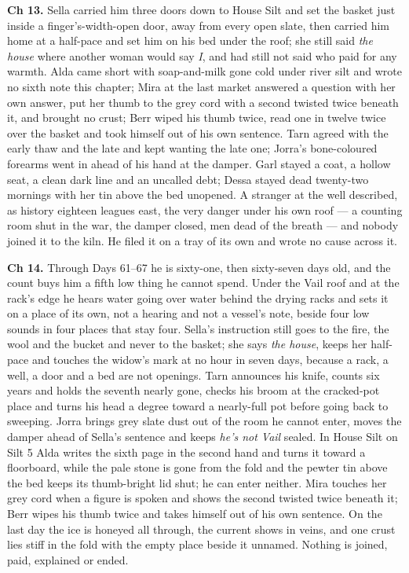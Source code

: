 \documentclass{design/chronicle}
\begin{document}
{\textbf{Ch 13.} Sella carried him three doors down to House Silt and set the basket just inside a finger’s-width-open door, away from every open slate, then carried him home at a half-pace and set him on his bed under the roof; she still said \emph{the house} where another woman would say \emph{I}, and had still not said who paid for any warmth. Alda came short with soap-and-milk gone cold under river silt and wrote no sixth note this chapter; Mira at the last market answered a question with her own answer, put her thumb to the grey cord with a second twisted twice beneath it, and brought no crust; Berr wiped his thumb twice, read one in twelve twice over the basket and took himself out of his own sentence. Tarn agreed with the early thaw and the late and kept wanting the late one; Jorra’s bone-coloured forearms went in ahead of his hand at the damper. Garl stayed a coat, a hollow seat, a clean dark line and an uncalled debt; Dessa stayed dead twenty-two mornings with her tin above the bed unopened. A stranger at the well described, as history eighteen leagues east, the very danger under his own roof --- a counting room shut in the war, the damper closed, men dead of the breath --- and nobody joined it to the kiln. He filed it on a tray of its own and wrote no cause across it.

\textbf{Ch 14.} Through Days 61–67 he is sixty-one, then sixty-seven days old, and the count buys him a fifth low thing he cannot spend. Under the Vail roof and at the rack’s edge he hears water going over water behind the drying racks and sets it on a place of its own, not a hearing and not a vessel’s note, beside four low sounds in four places that stay four. Sella’s instruction still goes to the fire, the wool and the bucket and never to the basket; she says \emph{the house}, keeps her half-pace and touches the widow’s mark at no hour in seven days, because a rack, a well, a door and a bed are not openings. Tarn announces his knife, counts six years and holds the seventh nearly gone, checks his broom at the cracked-pot place and turns his head a degree toward a nearly-full pot before going back to sweeping. Jorra brings grey slate dust out of the room he cannot enter, moves the damper ahead of Sella’s sentence and keeps \emph{he’s not Vail} sealed. In House Silt on Silt 5 Alda writes the sixth page in the second hand and turns it toward a floorboard, while the pale stone is gone from the fold and the pewter tin above the bed keeps its thumb-bright lid shut; he can enter neither. Mira touches her grey cord when a figure is spoken and shows the second twisted twice beneath it; Berr wipes his thumb twice and takes himself out of his own sentence. On the last day the ice is honeyed all through, the current shows in veins, and one crust lies stiff in the fold with the empty place beside it unnamed. Nothing is joined, paid, explained or ended.

}
\end{document}
